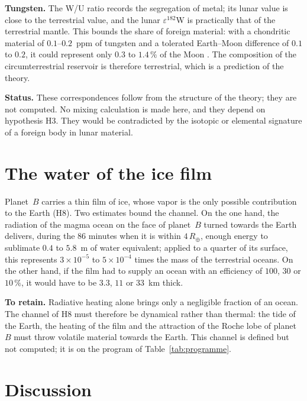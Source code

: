 \documentclass[11pt,a4paper]{article}
\newcommand{\Rt}{\ensuremath{R_\oplus}}
\begin{document}
\textbf{Tungsten.} The W/U ratio records the segregation of metal; its lunar value is close to the terrestrial value, and the lunar $\varepsilon^{182}$W is practically that of the terrestrial mantle. This bounds the share of foreign material: with a chondritic material of $0.1$--$0.2$~ppm of tungsten and a tolerated Earth--Moon difference of $0.1$ to $0.2$, it could represent only $0.3$ to $1.4\,\%$ of the Moon \citep{Debailleul2026a}. The composition of the circumterrestrial reservoir is therefore terrestrial, which is a prediction of the theory.

\textbf{Status.} These correspondences follow from the structure of the theory; they are not computed. No mixing calculation is made here, and they depend on hypothesis H3. They would be contradicted by the isotopic or elemental signature of a foreign body in lunar material.

\section{The water of the ice film}
\label{sec:eau}

Planet~$B$ carries a thin film of ice, whose vapor is the only possible contribution to the Earth (H8). Two estimates bound the channel. On the one hand, the radiation of the magma ocean on the face of planet~$B$ turned towards the Earth delivers, during the $86$ minutes when it is within $4\,\Rt$, enough energy to sublimate $0.4$ to $5.8$~m of water equivalent; applied to a quarter of its surface, this represents $3\times10^{-5}$ to $5\times10^{-4}$ times the mass of the terrestrial oceans. On the other hand, if the film had to supply an ocean with an efficiency of $100$, $30$ or $10\,\%$, it would have to be $3.3$, $11$ or $33$~km thick.

\textbf{To retain.} Radiative heating alone brings only a negligible fraction of an ocean. The channel of H8 must therefore be dynamical rather than thermal: the tide of the Earth, the heating of the film and the attraction of the Roche lobe of planet~$B$ must throw volatile material towards the Earth. This channel is defined but not computed; it is on the program of Table~\ref{tab:programme}.

\section{Discussion}
\label{sec:discussion}
\end{document}
